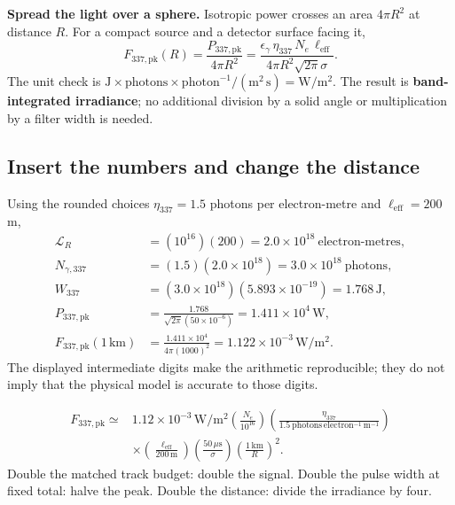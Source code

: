 \documentclass[11pt,a4paper]{article}
\begin{document}
\textbf{Spread the light over a sphere.} Isotropic power crosses an area $4\pi R^2$ at distance $R$. For a compact source and a detector surface facing it,
\begin{equation}
 \boxed{F_{337,\mathrm{pk}}(R)
 =\frac{P_{337,\mathrm{pk}}}{4\pi R^2}
 =\frac{\epsilon_\gamma\,\eta_{337}\,N_e\,\ell_{\mathrm{eff}}}
 {4\pi R^2\sqrt{2\pi}\sigma}.}
 \label{eq:peakflux}
\end{equation}
The unit check is $\mathrm J\times\mathrm{photons}\times\mathrm{photon}^{-1}/(\mathrm{m^2\,s})=\mathrm{W/m^2}$. The result is \textbf{band-integrated irradiance}; no additional division by a solid angle or multiplication by a filter width is needed.

\clearpage
\subsection{Insert the numbers and change the distance}
\label{sec:numbers}
Using the rounded choices $\eta_{337}=1.5$ photons per electron-metre and $\ell_{\mathrm{eff}}=200$ m,
\begin{align*}
 \mathcal L_R&=(10^{16})(200)=2.0\times10^{18}\ \text{electron-metres},\\
 N_{\gamma,337}&=(1.5)(2.0\times10^{18})=3.0\times10^{18}\ \text{photons},\\
 W_{337}&=(3.0\times10^{18})(5.893\times10^{-19})=1.768\,\mathrm J,\\
 P_{337,\mathrm{pk}}&=\frac{1.768}{\sqrt{2\pi}(50\times10^{-6})}
 =1.411\times10^4\,\mathrm W,\\
 F_{337,\mathrm{pk}}(1\,\mathrm{km})
 &=\frac{1.411\times10^4}{4\pi(1000)^2}
 =1.122\times10^{-3}\,\mathrm{W/m^2}.
\end{align*}
The displayed intermediate digits make the arithmetic reproducible; they do not imply that the physical model is accurate to those digits.

\begin{keybox}
\begin{align*}
 F_{337,\mathrm{pk}}\simeq{}&1.12\times10^{-3}\,\mathrm{W/m^2}
 \left(\frac{N_e}{10^{16}}\right)
 \left(\frac{\eta_{337}}{1.5\ \mathrm{photons\,electron^{-1}\,m^{-1}}}\right)\\
 &\times\left(\frac{\ell_{\mathrm{eff}}}{200\,\mathrm m}\right)
 \left(\frac{50\,\mu\mathrm{s}}{\sigma}\right)
 \left(\frac{1\,\mathrm{km}}{R}\right)^2.
\end{align*}
Double the matched track budget: double the signal. Double the pulse width at fixed total: halve the peak. Double the distance: divide the irradiance by four.
\end{keybox}
\end{document}

